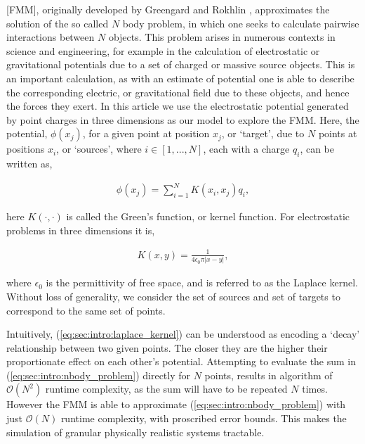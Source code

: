 \documentclass{IEEEcsmag}
\begin{document}
 [FMM], originally developed by Greengard and Rokhlin \cite{Greengard1987}, approximates the solution of the so called $N$ body problem, in which one seeks to calculate pairwise interactions between $N$ objects. This problem arises in numerous contexts in science and engineering, for example in the calculation of electrostatic or gravitational potentials due to a set of charged or massive source objects. This is an important calculation, as with an estimate of potential one is able to describe the corresponding electric, or gravitational field due to these objects, and hence the forces they exert. In this article we use the electrostatic potential generated by point charges in three dimensions as our model to explore the FMM. Here, the potential, $\phi(x_j)$, for a given point at position $x_j$, or `target', due to $N$ points at positions $x_i$, or `sources', where $i \in [1, ..., N]$, each with a charge $q_i$, can be written as,

\begin{eqnarray}
	\phi(x_j) = \sum_{i=1}^{N} K(x_i, x_j) q_i,
\label{eq:sec:intro:nbody_problem}
\end{eqnarray}


here $K(\cdot, \cdot)$ is called the Green's function, or kernel function. For electrostatic problems in three dimensions it is,

\begin{eqnarray}
	K(x, y) = \frac{1}{4\epsilon_0\pi|x-y|},
\label{eq:sec:intro:laplace_kernel}
\end{eqnarray}

where $\epsilon_0$ is the permittivity of free space, and is referred to as the Laplace kernel. Without loss of generality, we consider the set of sources and set of targets to correspond to the same set of points.

Intuitively, (\ref{eq:sec:intro:laplace_kernel}) can be understood as encoding a `decay' relationship between two given points. The closer they are the higher their proportionate effect on each other's potential. Attempting to evaluate the sum in (\ref{eq:sec:intro:nbody_problem}) directly for $N$ points, results in algorithm of $\mathcal{O}(N^2)$ runtime complexity, as the sum will have to be repeated $N$ times. However the FMM is able to approximate (\ref{eq:sec:intro:nbody_problem}) with just $\mathcal{O}(N)$ runtime complexity, with proscribed error bounds. This makes the simulation of granular physically realistic systems tractable.
\end{document}
